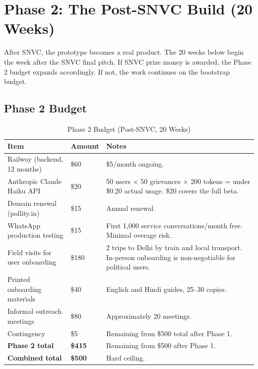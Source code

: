 \documentclass[12pt, a4paper]{article}
\begin{document}
\section{Phase 2: The Post-SNVC Build (20 Weeks)}

After SNVC, the prototype becomes a real product. The 20 weeks below begin
the week after the SNVC final pitch. If SNVC prize money is awarded, the
Phase 2 budget expands accordingly. If not, the work continues on the
bootstrap budget.

\subsection{Phase 2 Budget}

\begin{table}[ht]
\centering
\caption{Phase 2 Budget (Post-SNVC, 20 Weeks)}
\renewcommand{\arraystretch}{1.5}
\begin{tabularx}{\textwidth}{X p{2cm} X}
\toprule
\rowcolor{pollitylightblue}
\textbf{Item} & \textbf{Amount} & \textbf{Notes} \\
\midrule
Railway (backend, 12 months)         & \$60  & \$5/month ongoing. \\
Anthropic Claude Haiku API           & \$20  & 50 users $\times$ 50 grievances $\times$ 200 tokens = under \$0.20 actual usage. \$20 covers the full beta. \\
Domain renewal (pollity.in)          & \$15  & Annual renewal. \\
WhatsApp production testing          & \$15  & First 1,000 service conversations/month free. Minimal overage risk. \\
Field visits for user onboarding     & \$180 & 2 trips to Delhi by train and local transport. In-person onboarding is non-negotiable for political users. \\
Printed onboarding materials         & \$40  & English and Hindi guides, 25--30 copies. \\
Informal outreach meetings           & \$80  & Approximately 20 meetings. \\
Contingency                          & \$5   & Remaining from \$500 total after Phase 1. \\
\midrule
\rowcolor{lightgreen}
\textbf{Phase 2 total}               & \textbf{\$415} & Remaining from \$500 after Phase 1. \\
\midrule
\rowcolor{lightgreen}
\textbf{Combined total}              & \textbf{\$500} & Hard ceiling. \\
\bottomrule
\end{tabularx}
\end{table}
\end{document}
